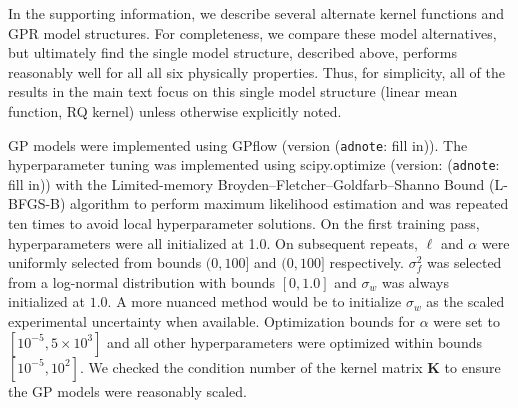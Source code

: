 \documentclass[journal=jacsat,manuscript=article, ]{achemso}
\newcommand{\xvec}{\ensuremath{\mathbf{x}}}
\newcommand{\adnote}[1]{{\color{OliveGreen} (\texttt{adnote}: #1)}}
\newcommand{\Ygc}[1][]{\ensuremath{y_{\text{GC}_{#1}}}}
\newcommand{\Ygcvec}[1][]{\ensuremath{\mathbf{y}_{\text{GC}_{#1}}}}
\begin{document}

In the supporting information, we describe several alternate kernel functions and GPR model structures. For completeness, we compare these model alternatives, but ultimately find the single model structure, described above, performs reasonably well for all all six physically properties. Thus, for simplicity, all of the results in the main text focus on this single model structure (linear mean function, RQ kernel) unless otherwise explicitly noted.

 GP models were implemented using GPflow \cite{Matthews2017GPflow:TensorFlow} (version \adnote{fill in}). The hyperparameter tuning was implemented using scipy.optimize \cite{Virtanen2020SciPyPython} (version: \adnote{fill in}) with the Limited-memory Broyden–Fletcher–Goldfarb–Shanno Bound (L-BFGS-B) algorithm to perform maximum likelihood estimation and was repeated ten times to avoid local hyperparameter solutions. On the first training pass, hyperparameters were all initialized at 1.0. On subsequent repeats, $\ell$ and $\alpha$ were uniformly selected from bounds $(0, 100]$ and $(0, 100]$ respectively. $\sigma^2_f$ was selected from a log-normal distribution with bounds $[0,1.0]$ and $\sigma_w$ was always initialized at $1.0$. A more nuanced method would be to initialize $\sigma_w$ as the scaled experimental uncertainty when available. Optimization bounds for $\alpha$ were set to $[10^{-5}, 5\times 10^3]$ and all other hyperparameters were optimized within bounds $[10^{-5}, 10^2]$. We checked the condition number of the kernel matrix $\mathbf{K}$ to ensure the GP models were reasonably scaled.
\end{document}
